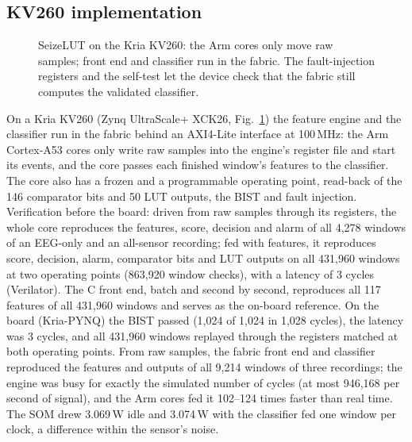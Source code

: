 \documentclass[conference]{IEEEtran}
\begin{document}
\subsection{KV260 implementation}
\begin{figure}[t]\centering
\resizebox{\columnwidth}{!}{}
\caption{SeizeLUT on the Kria KV260: the Arm cores only move raw samples; front end and classifier run in the fabric.
The fault-injection registers and the self-test let the device check that the fabric still computes the validated
classifier.}\label{fig:arch}
\end{figure}
On a Kria KV260 (Zynq UltraScale+ XCK26, Fig.~\ref{fig:arch}) the feature engine and the classifier run in the
fabric behind an AXI4-Lite interface at 100\,MHz: the Arm Cortex-A53 cores only write raw samples into the engine's
register file and start its events, and the core passes each finished window's features to the classifier. The core
also has a frozen and a programmable operating point, read-back of the 146 comparator bits and 50 LUT outputs, the
BIST and fault injection. Verification before the board: driven from raw samples through its registers, the whole
core reproduces the features, score, decision and alarm of all 4,278 windows of an EEG-only and an all-sensor
recording; fed with features, it reproduces score, decision, alarm, comparator bits and LUT outputs on all 431,960
windows at two operating points (863,920 window checks), with a latency of 3 cycles (Verilator). The C front end,
batch and second by second, reproduces all 117 features of all 431,960 windows and serves as the on-board reference.
On the board (Kria-PYNQ) the BIST passed (1,024 of 1,024 in 1,028 cycles), the latency was 3 cycles, and all 431,960
windows replayed through the registers matched at both operating points. From raw samples, the fabric front end and
classifier reproduced the features and outputs of all 9,214 windows of three recordings; the engine was busy for
exactly the simulated number of cycles (at most 946,168 per second of signal), and the Arm cores fed it 102--124
times faster than real time. The SOM drew 3.069\,W idle and 3.074\,W with the classifier fed one window per clock, a
difference within the sensor's noise.
\end{document}
